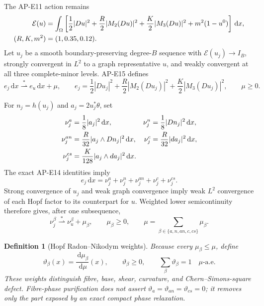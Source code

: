 \documentclass[10pt]{article}
\newtheorem{definition}[theorem]{Definition}
\newcommand{\dd}{\,\mathrm d}
\newcommand{\cE}{\mathcal E}
\begin{document}
The AP-E11 action remains
\begin{align}
 \cE(u)&=\int_\Omega\left[
 \frac12|Du|^2+\frac R2|M_2(Du)|^2+\frac K2|M_3(Du)|^2
 +m^2(1-u^0)\right]\dd x,\notag\\
 (R,K,m^2)&=(1,0.35,0.12).
 \label{eq:energy}
\end{align}
Let $u_j$ be a smooth boundary-preserving degree-$B$ sequence with
$\cE(u_j)\to I_B$, strongly convergent in $L^2$ to a graph representative
$u$, and weakly convergent at all three complete-minor levels.  AP-E15
defines
\begin{equation}
 e_j\dd x\stackrel{*}{\rightharpoonup}e_u\dd x+\mu,
 \qquad
 e_j=\frac12|Du_j|^2+\frac R2|M_2(Du_j)|^2
      +\frac K2|M_3(Du_j)|^2,\qquad \mu\geq0.
 \label{eq:mu}
\end{equation}

For $n_j=h(u_j)$ and $a_j=2u_j^*\theta$, set
\begin{align}
 \nu_j^a&=\frac18|a_j|^2\dd x,&
 \nu_j^n&=\frac18|Dn_j|^2\dd x,\notag\\
 \nu_j^{an}&=\frac R{32}|a_j\wedge Dn_j|^2\dd x,&
 \nu_j^c&=\frac R{32}|da_j|^2\dd x,\notag\\
 \nu_j^{cs}&=\frac K{128}|a_j\wedge da_j|^2\dd x.
 \label{eq:hopf-measures}
\end{align}
The exact AP-E14 identities imply
\begin{equation}
 e_j\dd x=\nu_j^a+\nu_j^n+\nu_j^{an}+\nu_j^c+\nu_j^{cs}.
 \label{eq:hopf-sum}
\end{equation}
Strong convergence of $u_j$ and weak graph convergence imply weak $L^2$
convergence of each Hopf factor to its counterpart for $u$.  Weighted lower
semicontinuity therefore gives, after one subsequence,
\begin{equation}
 \nu_j^\beta\stackrel{*}{\rightharpoonup}\nu_u^\beta+\mu_\beta,
 \qquad \mu_\beta\geq0,\qquad
 \mu=\sum_{\beta\in\{a,n,an,c,cs\}}\mu_\beta.
 \label{eq:component-defects}
\end{equation}

\begin{definition}[Hopf Radon--Nikodym weights]
Because every $\mu_\beta\leq\mu$, define
\begin{equation}
 \vartheta_\beta(x)=\frac{\dd\mu_\beta}{\dd\mu}(x),\qquad
 \vartheta_\beta\geq0,\qquad
 \sum_\beta\vartheta_\beta=1\quad\mu\text{-a.e.}
 \label{eq:weights}
\end{equation}
These weights distinguish fibre, base, shear, curvature, and
Chern--Simons-square defect.  Fibre-phase purification does not assert
$\vartheta_a=\vartheta_{an}=\vartheta_{cs}=0$; it removes only the part
exposed by an exact compact phase relaxation.
\end{definition}
\end{document}
